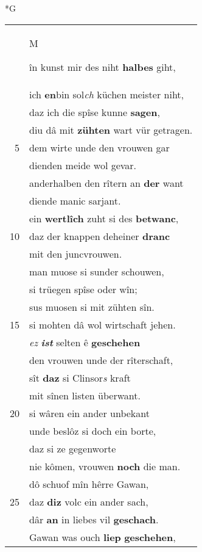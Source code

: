 \documentclass[8pt,a4paper,notitlepage]{article}
\begin{document}
\newpage
\begin{table}[ht]
\begin{minipage}[t]{0.5\linewidth}
\small
\begin{center}*G
\end{center}
\begin{tabular}{rl}
 & \begin{large}M\end{large}în kunst mir des niht \textbf{halbes} giht,\\ 
 & ich \textbf{en}bin sol\textit{ch} küchen meister niht,\\ 
 & daz ich die spîse kunne \textbf{sagen},\\ 
 & diu dâ mit \textbf{zühten} wart vür getragen.\\ 
5 & dem wirte unde den vrouwen gar\\ 
 & dienden meide wol gevar.\\ 
 & anderhalben den rîtern an \textbf{der} want\\ 
 & diende manic sarjant.\\ 
 & ein \textbf{wertlîch} zuht si des \textbf{betwanc},\\ 
10 & daz der knappen deheiner \textbf{dranc}\\ 
 & mit den juncvrouwen.\\ 
 & man muose si sunder schouwen,\\ 
 & si trüegen spîse oder wîn;\\ 
 & sus muosen si mit zühten sîn.\\ 
15 & si mohten dâ wol wirtschaft jehen.\\ 
 & \textit{ez} \textit{\textbf{ist}} selten ê \textbf{geschehen}\\ 
 & den vrouwen unde der rîterschaft,\\ 
 & sît \textbf{daz} si Clinsor\textit{s} kraft\\ 
 & mit sînen listen überwant.\\ 
20 & si wâren ein ander unbekant\\ 
 & unde beslôz si doch ein borte,\\ 
 & daz si ze gegenworte\\ 
 & nie kômen, vrouwen \textbf{noch} die man.\\ 
 & dô schuof mîn hêrre Gawan,\\ 
25 & daz \textbf{diz} volc ein ander sach,\\ 
 & dâr \textbf{an} in liebes vil \textbf{geschach}.\\ 
 & Gawan was ouch \textbf{liep} \textbf{geschehen},\\ 

\end{tabular}
\end{minipage}
\end{table}
\end{document}
